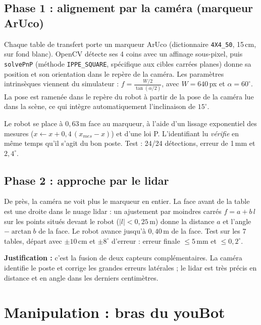\documentclass[11pt,a4paper]{article}
\newcommand{\code}[1]{\texttt{#1}}
\begin{document}
\subsection{Phase 1 : alignement par la caméra (marqueur ArUco)}
Chaque table de transfert porte un marqueur ArUco (dictionnaire \code{4X4\_50}, 15\,cm, sur fond
blanc). OpenCV détecte ses 4 coins avec un affinage sous-pixel, puis \code{solvePnP} (méthode
\code{IPPE\_SQUARE}, spécifique aux cibles carrées planes) donne sa position et son orientation
dans le repère de la caméra. Les paramètres intrinsèques viennent du simulateur :
$f = \frac{W/2}{\tan(\alpha/2)}$, avec $W = 640$\,px et $\alpha = 60^\circ$. La pose est ramenée dans
le repère du robot à partir de la pose de la caméra lue dans la scène, ce qui intègre automatiquement
l'inclinaison de $15^\circ$.

Le robot se place à $0{,}63$\,m face au marqueur, à l'aide d'un lissage exponentiel des mesures
($x \leftarrow x + 0{,}4\,(x_{mes} - x)$) et d'une loi P. L'identifiant lu \emph{vérifie} en même
temps qu'il s'agit du bon poste. Test : 24/24 détections, erreur de 1\,mm et $2{,}4^\circ$.

\subsection{Phase 2 : approche par le lidar}
De près, la caméra ne voit plus le marqueur en entier. La face avant de la table est une droite
dans le nuage lidar : un ajustement par moindres carrés $f = a + b\,l$ sur les points situés
devant le robot ($|l| < 0{,}25$\,m) donne la distance $a$ et l'angle $-\arctan b$ de la face. Le
robot avance jusqu'à $0{,}40$\,m de la face. Test sur les 7 tables, départ avec $\pm10$\,cm et
$\pm8^\circ$ d'erreur : erreur finale $\leq 5$\,mm et $\leq 0{,}2^\circ$.

\textbf{Justification :} c'est la fusion de deux capteurs complémentaires. La caméra identifie le
poste et corrige les grandes erreurs latérales ; le lidar est très précis en distance et en angle
dans les derniers centimètres.

\section{Manipulation : bras du youBot}
\end{document}
